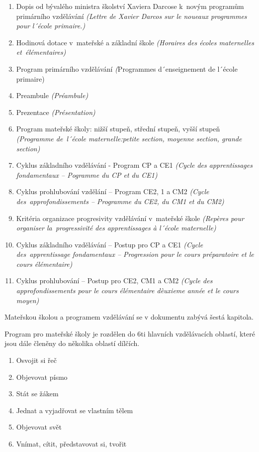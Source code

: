 	\begin{enumerate}[1]
		\setlength\itemsep{-2mm}
		\item Dopis od bývalého ministra školství Xaviera Darcose k novým programům primárního vzdělávání \textit{(Lettre de Xavier Darcos sur le noueaux programmes pour l´école primaire.)}
		\item Hodinová dotace v mateřské a základní škole \textit{(Horaires des écoles maternelles et élémentaires)}
		\item Program primárního vzdělávání \textit({Programmes d´enseignement  de l´école primaire)}
		\item Preambule \textit{(Préambule)}
		\item Prezentace \textit{(Présentation)}
		\item Program mateřské školy: nižší stupeň, střední stupeň, vyšší stupeň \textit{(Programme de l´école maternelle:petite section, moyenne section, grande section)}
		\item Cyklus základního vzdělávání - Program CP a CE1 \textit{(Cycle des apprentissages fondamentaux – Pogramme du CP et du CE1)}
		\item Cyklus prohlubování vzdělání – Program CE2, 1 a CM2 \textit{(Cycle des approfondissements – Programme du CE2, du CM1 et du CM2)}
		\item Kritéria organizace progresivity vzdělávání v mateřské škole \textit{(Repères pour organiser la progressivité des apprentissages à l´école maternelle)}
		\item Cyklus základního vzdělávání – Postup pro CP a CE1 \textit{(Cycle des apprentissage fondamentaux – Progression pour le cours préparatoire et le cours élémentaire)}
		\item Cyklus prohlubování – Postup pro CE2, CM1 a CM2 \textit{(Cycle des approfondissements pour le cours élémentaire dèuxieme année et le cours moyen)}
	\end{enumerate}


	Mateřskou školou a programem vzdělávání se v dokumentu zabývá šestá kapitola.

	Program pro mateřské školy je rozdělen do 6ti hlavních vzdělávacích oblastí, které jsou dále členěny do několika oblastí dílčích.
	
	\begin{enumerate}[1]
		\setlength\itemsep{-2mm}
		\item Osvojit si řeč 
		\item Objevovat písmo 
		\item Stát se žákem 
		\item Jednat a vyjadřovat se vlastním tělem 
		\item Objevovat svět
		\item Vnímat, cítit, představovat si, tvořit
	\end{enumerate}

